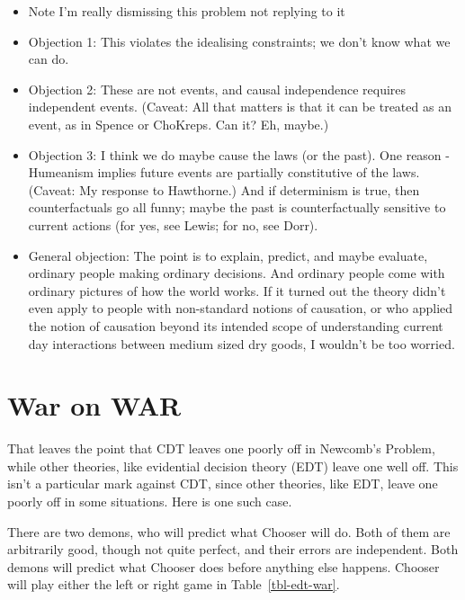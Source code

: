\documentclass[
  12pt,
  letterpaper,
  DIV=11,
  numbers=noendperiod]{scrreprt}
\providecommand{\tightlist}{%
  \setlength{\itemsep}{0pt}\setlength{\parskip}{0pt}}\usepackage{longtable,booktabs,array}
\begin{document}
\begin{itemize}
\tightlist
\item
  Note I'm really dismissing this problem not replying to it
\item
  Objection 1: This violates the idealising constraints; we don't know
  what we can do.
\item
  Objection 2: These are not events, and causal independence requires
  independent events. (Caveat: All that matters is that it can be
  treated as an event, as in Spence or ChoKreps. Can it? Eh, maybe.)
\item
  Objection 3: I think we do maybe cause the laws (or the past). One
  reason - Humeanism implies future events are partially constitutive of
  the laws. (Caveat: My response to Hawthorne.) And if determinism is
  true, then counterfactuals go all funny; maybe the past is
  counterfactually sensitive to current actions (for yes, see Lewis; for
  no, see Dorr).
\item
  General objection: The point is to explain, predict, and maybe
  evaluate, ordinary people making ordinary decisions. And ordinary
  people come with ordinary pictures of how the world works. If it
  turned out the theory didn't even apply to people with non-standard
  notions of causation, or who applied the notion of causation beyond
  its intended scope of understanding current day interactions between
  medium sized dry goods, I wouldn't be too worried.
\end{itemize}

\section{War on WAR}\label{sec-war-on-war}

That leaves the point that CDT leaves one poorly off in Newcomb's
Problem, while other theories, like evidential decision theory (EDT)
leave one well off. This isn't a particular mark against CDT, since
other theories, like EDT, leave one poorly off in some situations. Here
is one such case.

There are two demons, who will predict what Chooser will do. Both of
them are arbitrarily good, though not quite perfect, and their errors
are independent. Both demons will predict what Chooser does before
anything else happens. Chooser will play either the left or right game
in Table~\ref{tbl-edt-war}.
\end{document}
